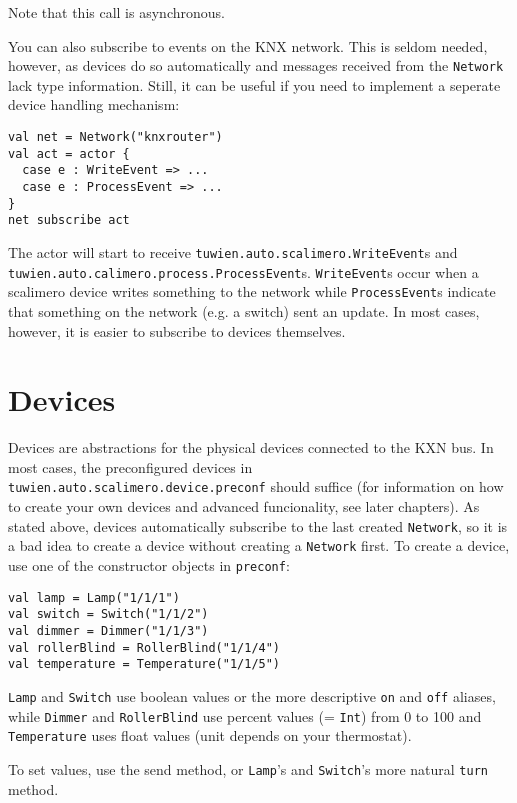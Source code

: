 Note that this call is asynchronous.

You can also subscribe to events on the KNX network. This is seldom needed, however, as devices do so automatically and messages received from the \lstinline!Network! lack type information. Still, it can be useful if you need to implement a seperate device handling mechanism:

\begin{lstlisting}
val net = Network("knxrouter")
val act = actor {
  case e : WriteEvent => ...
  case e : ProcessEvent => ...
}
net subscribe act
\end{lstlisting}

The actor will start to receive \lstinline!tuwien.auto.scalimero.WriteEvent!s and \lstinline!tuwien.auto.calimero.process.ProcessEvent!s. \lstinline!WriteEvent!s occur when a scalimero device writes something to the network while \lstinline!ProcessEvent!s indicate that something on the network (e.g. a switch) sent an update. In most cases, however, it is easier to subscribe to devices themselves.

\section{Devices}

Devices are abstractions for the physical devices connected to the KXN bus. In most cases, the preconfigured devices in \lstinline!tuwien.auto.scalimero.device.preconf! should suffice (for information on how to create your own devices and advanced funcionality, see later chapters). As stated above, devices automatically subscribe to the last created \lstinline!Network!, so it is a bad idea to create a device without creating a \lstinline!Network! first. To create a device, use one of the constructor objects in \lstinline!preconf!:

\begin{lstlisting}
val lamp = Lamp("1/1/1")
val switch = Switch("1/1/2")
val dimmer = Dimmer("1/1/3")
val rollerBlind = RollerBlind("1/1/4")
val temperature = Temperature("1/1/5")
\end{lstlisting}

\lstinline!Lamp! and \lstinline!Switch! use boolean values or the more descriptive \lstinline!on! and \lstinline!off! aliases, while \lstinline!Dimmer! and \lstinline!RollerBlind! use percent values (= \lstinline!Int!) from 0 to 100 and \lstinline!Temperature! uses float values (unit depends on your thermostat).

To set values, use the send method, or \lstinline!Lamp!'s and \lstinline!Switch!'s more natural \lstinline!turn! method.

